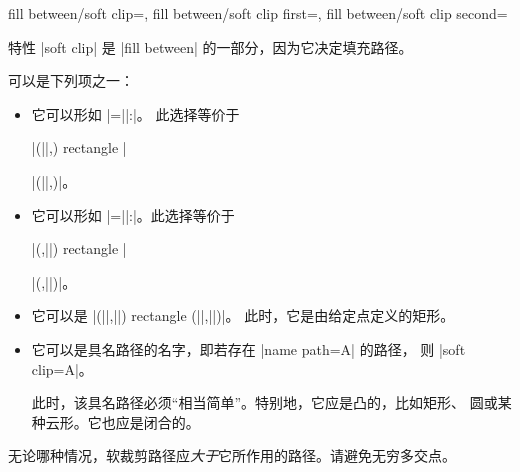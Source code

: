 \begin{tikzkeylist}{%
    fill between/soft clip=,
    fill between/soft clip first=,
    fill between/soft clip second=%
}
\begin{codeexample}[]
\end{codeexample}

    特性 |soft clip| 是 |fill between| 的一部分，因为它决定填充路径。

     可以是下列项之一：
    \begin{itemize}
        \item 它可以形如 |=||:|。
            此选择等价于

            |(||,) rectangle |

            |(||,)|。
        \item 它可以形如 |=||:|。此选择等价于

            |(,||) rectangle |

            |(,||)|。
        \item 它可以是
            |(||,||) rectangle (||,||)|。
            此时，它是由给定点定义的矩形。
        \item 它可以是具名路径的名字，即若存在 |name path=A| 的路径，
            则 |soft clip=A|。

            此时，该具名路径必须“相当简单”。特别地，它应是凸的，比如矩形、
            圆或某种云形。它也应是闭合的。
    \end{itemize}
    无论哪种情况，软裁剪路径应\emph{大于}它所作用的路径。请避免无穷多交点。
\begin{codeexample}[]
\end{codeexample}
\end{tikzkeylist}
